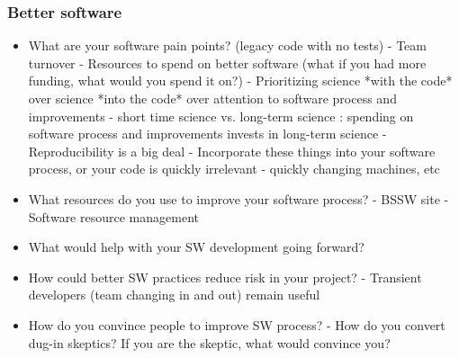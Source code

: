 \begin{frame}\frametitle{Better software}
\begin{itemize}
\item What are your software pain points? (legacy code with no tests)
  - Team turnover
  - Resources to spend on better software (what if you had more funding, what would you spend it on?)
  - Prioritizing science *with the code* over science *into the code* over attention to software process and improvements
    - short time science vs. long-term science : spending on software process and improvements invests in long-term science
  - Reproducibility is a big deal
  - Incorporate these things into your software process, or your code is quickly irrelevant - quickly changing machines, etc
\item What resources do you use to improve your software process?
  - BSSW site
  - Software resource management
\item What would help with your SW development going forward?
\item How could better SW practices reduce risk in your project?
  - Transient developers (team changing in and out) remain useful
\item How do you convince people to improve SW process?
  - How do you convert dug-in skeptics? If you are the skeptic, what would convince you? 
\end{itemize}
\end{frame}





